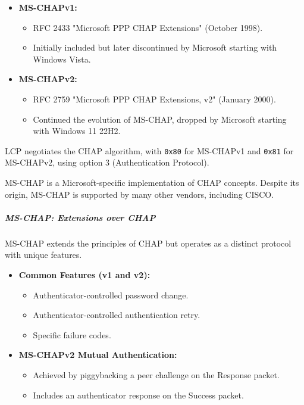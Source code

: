 \begin{itemize}
	\item \textbf{MS-CHAPv1:}
	      \begin{itemize}
		      \item RFC 2433 "Microsoft PPP CHAP Extensions" (October 1998).
		      \item Initially included but later discontinued by Microsoft starting with Windows Vista.
	      \end{itemize}

	\item \textbf{MS-CHAPv2:}
	      \begin{itemize}
		      \item RFC 2759 "Microsoft PPP CHAP Extensions, v2" (January 2000).
		      \item Continued the evolution of MS-CHAP, dropped by Microsoft starting with Windows 11 22H2.
	      \end{itemize}
\end{itemize}

LCP negotiates the CHAP algorithm, with \texttt{0x80} for MS-CHAPv1 and \texttt{0x81} for MS-CHAPv2, using option 3 (Authentication Protocol).

MS-CHAP is a Microsoft-specific implementation of CHAP concepts.
Despite its origin, MS-CHAP is supported by many other vendors, including CISCO.


\subparagraph{MS-CHAP: Extensions over CHAP}
MS-CHAP extends the principles of CHAP but operates as a distinct protocol with unique features.

\begin{itemize}
	\item \textbf{Common Features (v1 and v2):}
	      \begin{itemize}
		      \item Authenticator-controlled password change.
		      \item Authenticator-controlled authentication retry.
		      \item Specific failure codes.
	      \end{itemize}

	\item \textbf{MS-CHAPv2 Mutual Authentication:}
	      \begin{itemize}
		      \item Achieved by piggybacking a peer challenge on the Response packet.
		      \item Includes an authenticator response on the Success packet.
	      \end{itemize}
\end{itemize}

